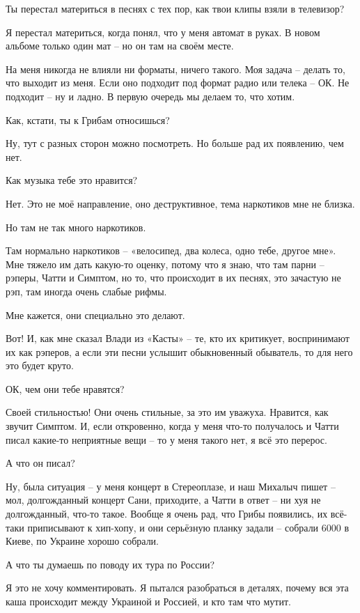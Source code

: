 Ты перестал материться в песнях с тех пор, как твои клипы взяли в телевизор?

Я перестал материться, когда понял, что у меня автомат в руках. В новом альбоме
только один мат – но он там на своём месте.

На меня никогда не влияли ни форматы, ничего такого. Моя задача – делать то,
что выходит из меня. Если оно подходит под формат радио или телека – ОК. Не
подходит – ну и ладно.  В первую очередь мы делаем то, что хотим.

Как, кстати, ты к Грибам относишься?

Ну, тут с разных сторон можно посмотреть. Но больше рад их появлению, чем нет.

Как музыка тебе это нравится?

Нет. Это не моё направление, оно деструктивное, тема наркотиков мне не близка.

Но там не так много наркотиков.

Там нормально наркотиков – «велосипед, два колеса, одно тебе, другое мне». Мне
тяжело им дать какую-то оценку, потому что я знаю, что там парни – рэперы,
Чатти и Симптом, но то, что происходит в их песнях, это зачастую не рэп, там
иногда очень слабые рифмы.

Мне кажется, они специально это делают.

Вот! И, как мне сказал Влади из «Касты» – те, кто их критикует, воспринимают их
как рэперов, а если эти песни услышит обыкновенный обыватель, то для него это
будет круто.

ОК, чем они тебе нравятся?

Своей стильностью! Они очень стильные, за это им уважуха. Нравится, как звучит
Симптом. И, если откровенно, когда у меня что-то получалось и Чатти писал
какие-то неприятные вещи – то у меня такого нет, я всё это перерос.

А что он писал?

Ну, была ситуация – у меня концерт в Стереоплазе, и наш Михалыч пишет – мол,
долгожданный концерт Сани, приходите, а Чатти в ответ – ни хуя не долгожданный,
что-то такое. Вообще я очень рад, что Грибы появились, их всё-таки приписывают
к хип-хопу, и они серьёзную планку задали – собрали 6000 в Киеве, по Украине
хорошо собрали.

А что ты думаешь по поводу их тура по России?

Я это не хочу комментировать. Я пытался разобраться в деталях, почему вся эта
каша происходит между Украиной и Россией, и кто там что мутит.

